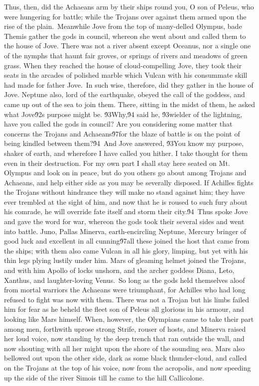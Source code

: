 {  Thus, then, did the Achaeans arm by their ships round you, O son of Peleus, who were hungering for battle; while the Trojans over against them armed upon the rise of the plain.\
Meanwhile Jove from the top of many-delled Olympus, bade Themis gather the gods in council, whereon she went about and called them to the house of Jove. There was not a river absent except Oceanus, nor a single one of the nymphs that haunt fair groves, or springs of rivers and meadows of green grass. When they reached the house of cloud-compelling Jove, they took their seats in the arcades of polished marble which Vulcan with his consummate skill had made for father Jove.\
In such wise, therefore, did they gather in the house of Jove. Neptune also, lord of the earthquake, obeyed the call of the goddess, and came up out of the sea to join them. There, sitting in the midst of them, he asked what Jove\'92s purpose might be. \'93Why,\'94 said he, \'93wielder of the lightning, have you called the gods in council? Are you considering some matter that concerns the Trojans and Achaeans\'97for the blaze of battle is on the point of being kindled between them?\'94\
And Jove answered, \'93You know my purpose, shaker of earth, and wherefore I have called you hither. I take thought for them even in their destruction. For my own part I shall stay here seated on Mt. Olympus and look on in peace, but do you others go about among Trojans and Achaeans, and help either side as you may be severally disposed. If Achilles fights the Trojans without hindrance they will make no stand against him; they have ever trembled at the sight of him, and now that he is roused to such fury about his comrade, he will override fate itself and storm their city.\'94\
Thus spoke Jove and gave the word for war, whereon the gods took their several sides and went into battle. Juno, Pallas Minerva, earth-encircling Neptune, Mercury bringer of good luck and excellent in all cunning\'97all these joined the host that came from the ships; with them also came Vulcan in all his glory, limping, but yet with his thin legs plying lustily under him. Mars of gleaming helmet joined the Trojans, and with him Apollo of locks unshorn, and the archer goddess Diana, Leto, Xanthus, and laughter-loving Venus.\
So long as the gods held themselves aloof from mortal warriors the Achaeans were triumphant, for Achilles who had long refused to fight was now with them. There was not a Trojan but his limbs failed him for fear as he beheld the fleet son of Peleus all glorious in his armour, and looking like Mars himself. When, however, the Olympians came to take their part among men, forthwith uprose strong Strife, rouser of hosts, and Minerva raised her loud voice, now standing by the deep trench that ran outside the wall, and now shouting with all her might upon the shore of the sounding sea. Mars also bellowed out upon the other side, dark as some black thunder-cloud, and called on the Trojans at the top of his voice, now from the acropolis, and now speeding up the side of the river Simois till he came to the hill Callicolone.\
}

